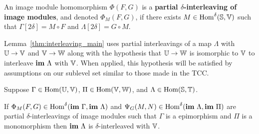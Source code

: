 \begin{definition}
  An image module homomorphism $\Phi(F, G)$ is a \textbf{partial $\delta$-interleaving of image modules}, and denoted $\Phi_M(F, G)$, if there exists $M\in\mathrm{Hom}^\delta(\mathbb{S},\mathbb{V})$ such that $\Gamma[2\delta] = M\circ F$ and $\Lambda[2\delta] = G\circ M$.
\end{definition}

Lemma~\ref{thm:interleaving_main} uses partial interleavings of a map $\Lambda$ with $\mathbb{U}\to\mathbb{V}$ and $\mathbb{V}\to\mathbb{W}$ along with the hypothesis that $\mathbb{U}\to \mathbb{W}$ is isomorphic to $\mathbb{V}$ to interleave $\mathbf{im}~\Lambda$ with $\mathbb{V}$.
When applied, this hypothesis will be satisfied by assumptions on our sublevel set similar to those made in the TCC.

\begin{lemma}\label{thm:interleaving_main}
  Suppose $\Gamma\in\mathrm{Hom}(\mathbb{U},\mathbb{V})$, $\Pi\in\mathrm{Hom}(\mathbb{V},\mathbb{W})$, and $\Lambda\in\mathrm{Hom}(\mathbb{S}, \mathbb{T})$.

  If $\Phi_M(F, G)\in\mathrm{Hom}^\delta(\mathbf{im}~\Gamma, \mathbf{im}~\Lambda)$ and $\Psi_G(M, N)\in\mathrm{Hom}^\delta(\mathbf{im}~\Lambda, \mathbf{im}~\Pi)$ are partial $\delta$-interleavings of image modules such that $\Gamma$ is a epimorphism and $\Pi$ is a monomorphism then $\mathbf{im}~\Lambda$ is $\delta$-interleaved with $\mathbb{V}$.
\end{lemma}
